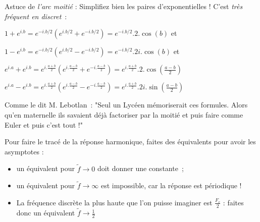  
 \begin{remarque}
 Astuce de \emph{l'arc moitié} :
 Simplifiez bien les paires d'exponentielles ! C'est \emph{très fréquent en discret}~:  

 $1 + e^{i.b} = e^{-i.b/2} (e^{i.b/2} + e^{-i.b/2}) = e^{-i.b/2}.2.\cos(b)$ et  

 $1 - e^{i.b} = e^{-i.b/2} (e^{i.b/2} - e^{-i.b/2}) = e^{-i.b/2}.2i.\cos(b)$ et  

 $e^{i.a} + e^{i.b} = e^{i.\frac{a+b}{2}} (e^{i.\frac{a-b}{2}} + e^{-i.\frac{a-b}{2}}) = e^{i.\frac{a+b}{2}}.2.\cos\left(\frac{a-b}{2}\right)$  

 $e^{i.a} - e^{i.b} = e^{i.\frac{a+b}{2}} (e^{i.\frac{a-b}{2}} - e^{-i.\frac{a-b}{2}}) = e^{i.\frac{a+b}{2}}.2i.\sin\left(\frac{a-b}{2}\right)$
 
 Comme le dit M. Lebotlan~: "Seul un Lycéen mémoriserait ces formules. 
  Alors qu'en maternelle ils savaient déjà factoriser par la moitié et puis faire comme Euler et puis c'est tout !"
\end{remarque}
Pour faire le tracé de la réponse harmonique, faites des équivalents pour avoir les asymptotes :
\begin{itemize}
\item  un équivalent pour $\tilde{f} \to 0$ doit donner une constante~;
\item un équivalent pour $\tilde{f} \to \infty$ est impossible, car la réponse est périodique ! 
\item La fréquence discrète la plus haute que l'on puisse imaginer est $\frac{F_e}{2}$ : faites donc un équivalent $\tilde{f} \to \frac{1}{2}$

\end{itemize}
  
   
